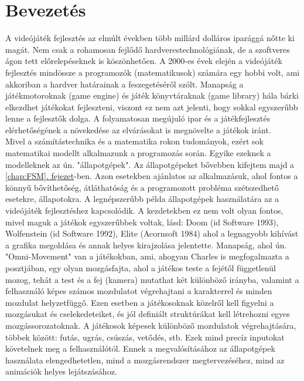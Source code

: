 \chapter{Bevezetés}

A videójáték fejlesztés az elmúlt években több millárd dolláros iparággá nőtte ki magát. Nem csak a rohamosan fejlődő hardverestechnológiának, de a szoftveres ágon tett előrelepéseknek is köszönhetően. A 2000-es évek elején a videójáték fejlesztés mindössze a programozók (matematikusok) számára egy hobbi volt, ami akkoriban a hardver határainak a feszegetéséről szólt. Manapság a játékmotoroknak (game engine) és játék könyvtáraknak (game library) hála bárki elkezdhet játékokat fejleszteni, viszont ez nem azt jelenti, hogy sokkal egyszerűbb lenne a fejlesztők dolga. A folyamatosan megújuló ipar és a játékfejlesztés elérhetőségének a növekedése az elvárásokat is megnö\-velte a játékok iránt.\\

Mivel a számítástechnika és a matematika rokon tudományok, ezért sok matematikai modellt alkalmazunk a programozás során. Egyike ezeknek a modelleknek az ún. "állapotgépek". Az állapotgépeket bővebben kifejtem majd a \hyperref[chap:FSM]{\ref{chap:FSM}. fejezet}-ben. Azon esetekben ajánlatos az alkalmazásuk, ahol fontos a könnyű bővíthetőség, átláthatóság és a programozott probléma szétszedhető esetekre, állapotokra. A legnépszerűbb példa állapotgépek hasz\-nálatára az a videójáték fejlesztéshez kapcsolódik. A kezdetekben ez nem volt olyan fontos, mivel maguk a játékok egyszerűbbek voltak, lásd: Doom (id Software 1993), Wolfenstein (id Software 1992), Elite (Acornsoft 1984) ahol a legnagyobb kihívást a grafika megoldása és annak helyes kirajzolása jelentette. Manapság, ahol ún. "Omni-Movement" van a játékokban, ami, ahogyan Charles \cite{charles2024} is megfogalmazta a posztjában, egy olyan mozgásfajta, ahol a játékos teste a fejétől függetlenül mozog, tehát a test és a fej (kamera) mutathat két különböző irányba, valamint a felhasználó képes számos mozdulatot végrehajtani a karakterrel és minden mozdulat helyzetfüggő. Ezen esetben a játékosoknak közelről kell figyelni a mozgásukat és cselekedeteiket, és jól definiált struktúrákat kell létrehozni egyes mozgássorozatoknak. A játékosok képesek különböző mozdulatok végre\-hajtására, többek között: futás, ugrás, csúszás, vetődés, stb. Ezek mind precíz inputokat követelnek meg a felhasználótól. Ennek a megvalósításához az állapotgépek használata elengedhetetlen, mind a mozgásrendszer megtervezéséhez, mind az animációk helyes lejátszásához.\\

